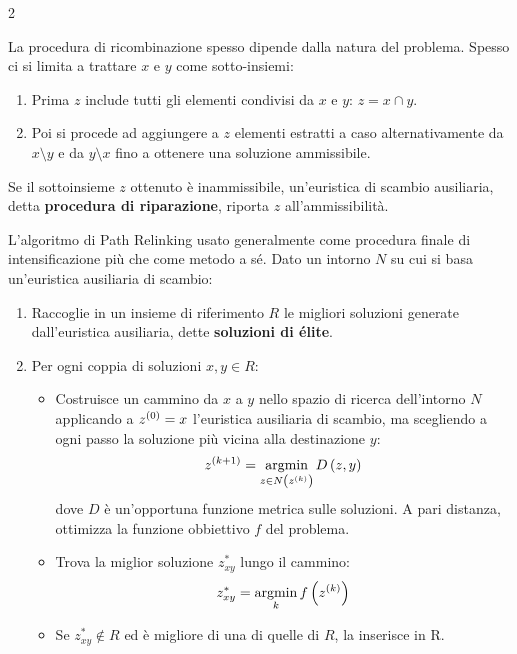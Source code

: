 \documentclass[\main/main.tex]{subfiles}
\begin{document}
\begin{multicols}{2}
\begin{definition}
    La procedura di ricombinazione spesso dipende dalla natura del problema. Spesso ci si limita a trattare \(x\) e \(y\) come sotto-insiemi:
    \begin{enumerate}
        \item Prima \(z\) include tutti gli elementi condivisi da \(x\) e \(y\): \(z = x \cap y\).
        \item Poi si procede ad aggiungere a \(z\) elementi estratti a caso alternativamente da \(x \setminus y\) e da \(y \setminus x\) fino a ottenere una soluzione ammissibile.
    \end{enumerate}
    
    Se il sottoinsieme \(z\) ottenuto è inammissibile, un'euristica di scambio ausiliaria, detta \textbf{procedura di riparazione}, riporta \(z\) all'ammissibilità.
\end{definition}
\end{multicols}
\clearpage
\begin{definition}
    L'algoritmo di Path Relinking usato generalmente come procedura finale di intensificazione più che come metodo a sé. Dato un intorno \(N\) su cui si basa un'euristica ausiliaria di scambio:
    \begin{enumerate}
        \item Raccoglie in un insieme di riferimento \(R\) le migliori soluzioni generate dall'euristica ausiliaria, dette \textbf{soluzioni di élite}.
        \item Per ogni coppia di soluzioni \(x, y \in R\):
        \begin{itemize}
            \item Costruisce un cammino da \(x\) a \(y\) nello spazio di ricerca dell'intorno \(N\) applicando a \(z^{\left(0\right)} = x\) l'euristica ausiliaria di scambio, ma scegliendo a ogni passo la soluzione più vicina alla destinazione \(y\):
            \[
                z^{\left(k+1\right)} = \operatorname*{argmin}_{z \in N\left(z^{\left(k\right)}\right)} D\left(z, y\right)
            \]
            dove \(D\) è un'opportuna funzione metrica sulle soluzioni. A pari distanza, ottimizza la funzione obbiettivo \(f\) del problema.
            \item Trova la miglior soluzione \(z^*_{xy}\) lungo il cammino:
            \[
                z_{xy}^* = \operatorname*{argmin}_k f\left(z^{\left(k\right)}\right)
            \]
            \item Se \(z_{xy}^* \not\in R\) ed è migliore di una di quelle di \(R\), la inserisce in R.
        \end{itemize}
    \end{enumerate}
\end{definition}
\end{document}
